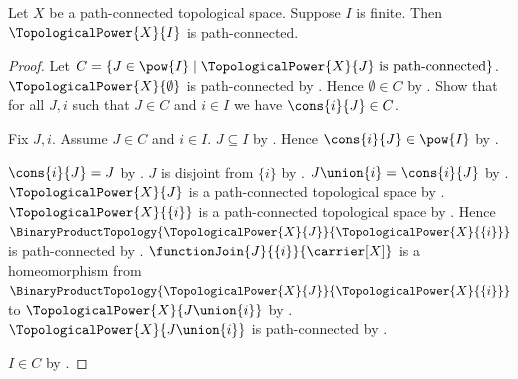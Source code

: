 \begin{theorem}\label{finite_topological_power_is_path_connected}
    Let $X$ be a path-connected topological space.
    Suppose $I$ is finite.
    Then $\TopologicalPower{X}{I}$ is path-connected.
\end{theorem}
\begin{proof}
    Let $C=\{J\in\pow{I}\mid\text{$\TopologicalPower{X}{J}$ is path-connected}\}$.
    $\TopologicalPower{X}{\emptyset}$ is path-connected by
        .
    Hence $\emptyset\in C$ by .
    Show that for all $J,i$ such that $J\in C$ and $i\in I$ we have $\cons{i}{J}\in C$.
    \begin{subproof}
        Fix $J,i$.
        Assume $J\in C$ and $i\in I$.
        $J\subseteq I$ by .
        Hence $\cons{i}{J}\in\pow{I}$ by .
        \begin{byCase}
                $\cons{i}{J}=J$ by .
                $J$ is disjoint from $\{i\}$ by .
                $J\union\{i\}=\cons{i}{J}$ by .
                $\TopologicalPower{X}{J}$ is a path-connected topological space by
                    .
                $\TopologicalPower{X}{\{i\}}$ is a path-connected topological space by
                    .
                Hence $\BinaryProductTopology{\TopologicalPower{X}{J}}{\TopologicalPower{X}{\{i\}}}$
                    is path-connected by .
                $\functionJoin{J}{\{i\}}{\carrier[X]}$ is a homeomorphism from
                    $\BinaryProductTopology{\TopologicalPower{X}{J}}{\TopologicalPower{X}{\{i\}}}$
                    to $\TopologicalPower{X}{J\union\{i\}}$ by .
                $\TopologicalPower{X}{J\union\{i\}}$ is path-connected by
                    .
        \end{byCase}
    \end{subproof}
    $I\in C$ by .
\end{proof}
